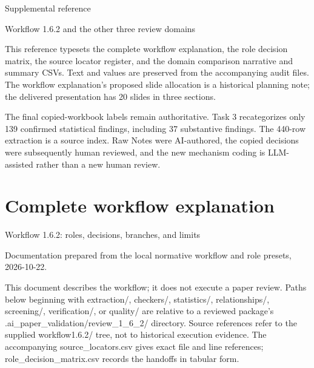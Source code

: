\documentclass[10pt,a4paper]{article}
\begin{document}
\raggedright
{\sffamily\LARGE Supplemental reference\par}
{\large Workflow 1.6.2 and the other three review domains\par}
This reference typesets the complete workflow explanation, the role decision matrix, the source locator register, and the domain comparison narrative and summary CSVs. Text and values are preserved from the accompanying audit files. The workflow explanation's proposed slide allocation is a historical planning note; the delivered presentation has 20 slides in three sections.\par
The final copied-workbook labels remain authoritative. Task 3 recategorizes only 139 confirmed statistical findings, including 37 substantive findings. The 440-row extraction is a source index. Raw Notes were AI-authored, the copied decisions were subsequently human reviewed, and the new mechanism coding is LLM-assisted rather than a new human review.\par
\tableofcontents\clearpage
\section{Complete workflow explanation}
Workflow 1.\allowbreak{}6.\allowbreak{}2: roles, decisions, branches, and limits\par
Documentation prepared from the local normative workflow and role presets, 2026-\allowbreak{}10-\allowbreak{}22.\allowbreak{}\par
This document describes the workflow; it does not execute a paper review.\allowbreak{} Paths below beginning with extraction/\allowbreak{}, checkers/\allowbreak{}, statistics/\allowbreak{}, relationships/\allowbreak{}, screening/\allowbreak{}, verification/\allowbreak{}, or quality/\allowbreak{} are relative to a reviewed package's .\allowbreak{}ai\_\allowbreak{}paper\_\allowbreak{}validation/\allowbreak{}review\_\allowbreak{}1\_\allowbreak{}6\_\allowbreak{}2/\allowbreak{} directory.\allowbreak{} Source references refer to the supplied workflow1.\allowbreak{}6.\allowbreak{}2/\allowbreak{} tree, not to historical execution evidence.\allowbreak{} The accompanying source\_\allowbreak{}locators.\allowbreak{}csv gives exact file and line references; role\_\allowbreak{}decision\_\allowbreak{}matrix.\allowbreak{}csv records the handoffs in tabular form.\allowbreak{}\par
\end{document}
